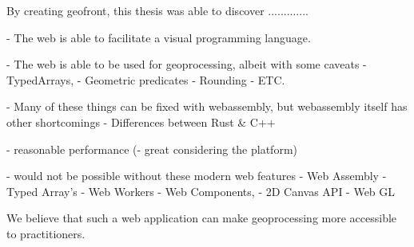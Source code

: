 





By creating geofront, this thesis was able to discover .............

- The web is able to facilitate a visual programming language.

- The web is able to be used for geoprocessing, albeit with some caveats
  - TypedArrays,
  - Geometric predicates 
  - Rounding
  - ETC.

- Many of these things can be fixed with webassembly, but webassembly itself has other shortcomings
  - Differences between Rust \& C++

- reasonable performance 
  (- great considering the platform)

- would not be possible without these modern web features
  - Web Assembly 
  - Typed Array's 
  - Web Workers
  - Web Components,
  - 2D Canvas API
  - Web GL


We believe that such a web application can make geoprocessing more accessible to practitioners.







